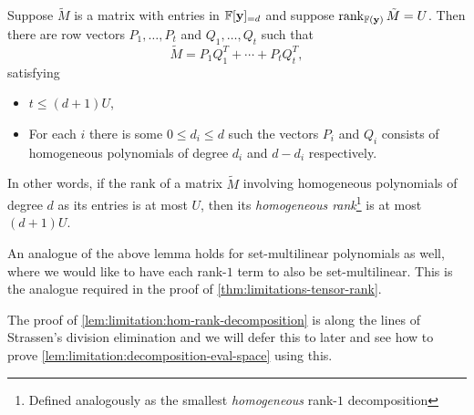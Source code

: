 \begin{lemma}\label{lem:limitation:hom-rank-decomposition}
  Suppose $\tilde{M}$ is a matrix with entries in $\mathbb{F}[\mathbf{y}]_{=d}$ and suppose $\operatorname{rank}_{\mathbb{F}(\mathbf{y})} \tilde{M} = U$. Then there are row vectors $P_1,\ldots, P_{t}$ and $Q_1,\ldots, Q_t$ such that
  \[
    \tilde{M} = P_1 Q_1^T + \cdots + P_t Q_t^T,
  \]
  satisfying
  \begin{itemize}
  \item $t \leq (d+1) U$,
  \item For each $i$ there is some $0 \leq d_i \leq d$ such the vectors $P_i$ and $Q_i$ consists of homogeneous polynomials of degree $d_i$ and $d - d_i$ respectively.  
  \end{itemize}
\end{lemma}

In other words, if the rank of a matrix $\tilde{M}$ involving homogeneous polynomials of degree $d$ as its entries is at most $U$, then its \emph{homogeneous rank}\footnote{Defined analogously as the smallest \emph{homogeneous} rank-$1$ decomposition} is at most $(d+1) U$. 

An analogue of the above lemma holds for set-multilinear polynomials as well, where we would like to have each rank-$1$ term to also be set-multilinear. This is the analogue required in the proof of \autoref{thm:limitations-tensor-rank}. 

The proof of \autoref{lem:limitation:hom-rank-decomposition} is along the lines of Strassen's division elimination and we will defer this to later and see how to prove \autoref{lem:limitation:decomposition-eval-space} using this.

